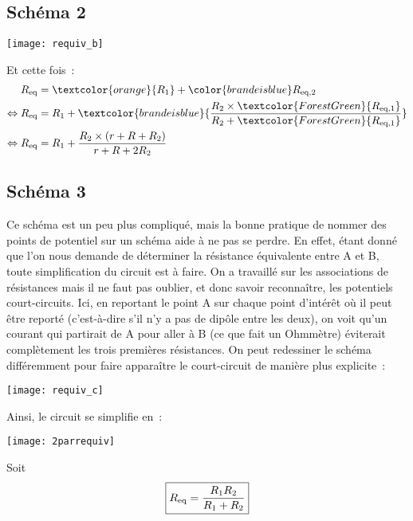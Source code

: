 \documentclass[../TDE1-E2.tex]{subfiles}%
\begin{document}
{\subsection{Schéma 2}
\begin{center}
    \texttt{[image: requiv\_b]}
\end{center}
Et cette fois~:
\begin{align*}
    R_{\rm eq}                 & =
    \textcolor{orange}{R_1} + \color{brandeisblue}R_{\rm eq,2} \\
    \Leftrightarrow R_{\rm eq} & =
        R_1 + \textcolor{brandeisblue}{\frac{
        R_2\times \textcolor{ForestGreen}{R_{\rm eq,1}}}{
        R_2 + \textcolor{ForestGreen}{R_{\rm eq,1}}}} \\
    \Leftrightarrow R_{\rm eq} & =
        R_1 + \frac{R_2\times(r+R+R_2)}{r+R+2R_2}\\
\end{align*}

\subsection{Schéma 3}
Ce schéma est un peu plus compliqué, mais la bonne pratique de nommer des points
de potentiel sur un schéma aide à ne pas se perdre. En effet, étant donné que
l'on nous demande de déterminer la résistance équivalente entre A et B, toute
simplification du circuit est à faire. On a travaillé sur les associations de
résistances mais il ne faut pas oublier, et donc savoir reconnaître, les
potentiels court-circuits. Ici, en reportant le point A sur chaque point
d'intérêt où il peut être reporté (c'est-à-dire s'il n'y a pas de dipôle entre
les deux), on voit qu'un courant qui partirait de A pour aller à B (ce que fait
un Ohmmètre) éviterait complètement les trois premières résistances. On peut
redessiner le schéma différemment pour faire apparaître le court-circuit de
manière plus explicite~:

\begin{center}
    \texttt{[image: requiv\_c]}
\end{center}

Ainsi, le circuit se simplifie en~:
\begin{center}
    \texttt{[image: 2parrequiv]}
\end{center}
Soit
\[ \boxed{R_{\rm eq} = \frac{R_1R_2}{R_1 + R_2}}\]
}
\end{document}
